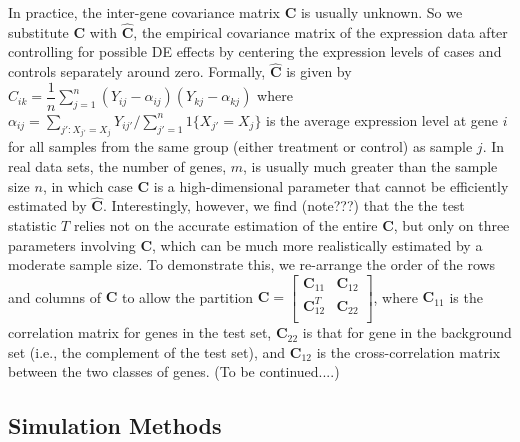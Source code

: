 \documentclass[a4,center,fleqn]{NAR}
\newcommand{\OurMethod}{MEQLEA}
\begin{document}
	In practice, the inter-gene covariance matrix $\bm C$ is usually unknown. So we substitute $\bm C$
	with $\hat {\bm C}$, the empirical covariance matrix of the expression data after controlling for
	possible DE effects by centering the expression levels of cases and controls separately around
	zero. Formally, $\hat {\bm C}$ is given by $\hat
	C_{ik}=\dfrac{1}{n}\sum_{j=1}^n(Y_{ij}-\alpha_{ij})(Y_{kj}-\alpha_{kj})$ where
	$\alpha_{ij}=\sum_{j':X_{j'}=X_{j}}Y_{ij'}/\sum_{j'=1}^n1\{X_{j'}=X_{j}\}$ is the average expression
	level at gene $i$ for all samples from the same group (either treatment or control) as sample $j$.
	In real data sets, the number of genes, $m$, is usually much greater than the sample size $n$, in
	which case $\bm C$ is a high-dimensional parameter that cannot be efficiently estimated by $\hat
	{\bm C}$. Interestingly, however, we find (note???) that the the test statistic $T$ relies not on
	the accurate estimation of the entire $\bm C$, but only on three parameters involving $\bm C$, which
	can be much more realistically estimated by a moderate sample size. To demonstrate this, we
	re-arrange the order of the rows and columns of $\bm C$ to allow the partition $\bm
	C=\left[\begin{array}{cc}
	\bm C_{11} & \bm C_{12} \\       \bm C_{12}^T & \bm C_{22} \\      \end{array}\right] $,
	where $\bm C_{11}$ is the correlation matrix for genes in the test set, $\bm C_{22}$ is that for
	gene in the background set (i.e., the complement of the test set), and $\bm C_{12}$ is the
	cross-correlation matrix between the two classes of genes. (To be continued....)
	
	
	
	
	\subsection{Simulation Methods}
	
\end{document}
